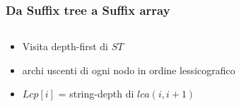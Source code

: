 \begin{frame}[fragile]
\frametitle{Da Suffix tree a Suffix array}
\begin{columns}
\begin{column}{0.5\textwidth}
\begin{itemize}[<+->]
\item
Visita depth-first di $ST$
\item
archi uscenti di ogni nodo in ordine lessicografico
\item
$Lcp[i]$ = string-depth di $lca(i,i+1)$
\end{itemize}
\end{column}
\begin{column}{0.4\textwidth}
\begin{center}
\end{center}
\end{column}
\end{columns}
\end{frame}

